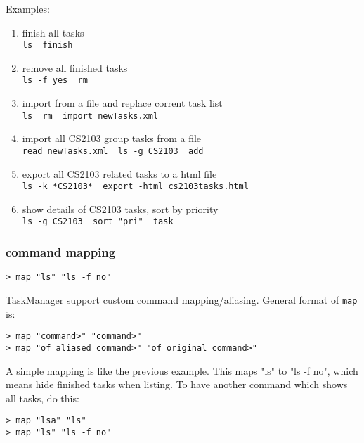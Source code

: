 \documentclass[12pt, a4paper]{article}
\begin{document}
Examples:

\begin{enumerate}
\item finish all tasks\\
  \texttt{ls \textbar \  finish}

\item remove all finished tasks\\
  \texttt{ls -f yes \textbar \  rm}

\item import from a file and replace corrent task list\\
  \texttt{ls \textbar \  rm \textbar \  import newTasks.xml}

\item import all CS2103 group tasks from a file\\
  \texttt{read newTasks.xml \textbar \  ls -g CS2103 \textbar \  add}

\item export all CS2103 related tasks to a html file\\
  \texttt{ls -k *CS2103* \textbar \  export -html cs2103tasks.html}

\item show details of CS2103 tasks, sort by priority\\
  \texttt{ls -g CS2103 \textbar \  sort "pri" \textbar \  task}
\end{enumerate}

\subsubsection{command mapping}

\texttt{\textgreater \ map "ls" "ls -f no"}

TaskManager support custom command mapping/aliasing. General format of \texttt{map} is:

\texttt{\textgreater \ map "\textlessnew command\textgreater" "\textlessoriginal command\textgreater"\\
  \textgreater \ map "\textlesspattern of aliased command\textgreater" "\textlesspattern of original command\textgreater"}

A simple mapping is like the previous example. This maps "ls" to "ls -f no", which means hide finished tasks when listing.
To have another command which shows all tasks, do this:

\texttt{\textgreater \ map "lsa" "ls"\\
  \textgreater \ map "ls" "ls -f no"}
\end{document}
